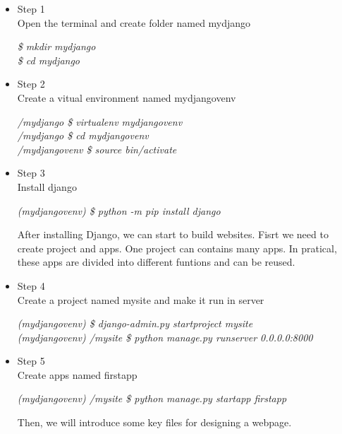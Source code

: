 \begin{itemize}
	  
		\item Step 1\\
		Open the terminal and create folder named mydjango
		\begin{enumerate}
			\emph {\$ mkdir mydjango}\\
			\emph {\$ cd mydjango}
		\end{enumerate}	
		\item Step 2\\
		Create a vitual environment named mydjangovenv
		\begin{enumerate}
			\emph {/mydjango \$ virtualenv mydjangovenv}\\
			\emph {/mydjango \$ cd mydjangovenv}\\
			\emph {/mydjangovenv \$ source bin/activate}
		\end{enumerate}	
		\item Step 3\\
		Install django
		\begin{enumerate}
			\emph {(mydjangovenv) \$ python -m pip install django}\\
		\end{enumerate}	

After installing Django, we can start to build websites. Fisrt we need to create project and apps. One project can contains many apps. In pratical, these apps are divided into different funtions and can be reused. 
		\item Step 4\\
		Create a project named mysite and make it run in server
		\begin{enumerate}
			\emph {(mydjangovenv) \$ django-admin.py startproject mysite}\\
			\emph {(mydjangovenv) /mysite \$ python manage.py runserver 0.0.0.0:8000}
		\end{enumerate}	
		\item Step 5\\
		Create apps named firstapp
		\begin{enumerate}
			\emph {(mydjangovenv) /mysite \$ python manage.py startapp firstapp}\\
		\end{enumerate}

Then, we will introduce some key files for designing a webpage.
		

\end{itemize}
